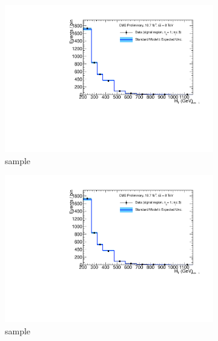 \begin{figure}[h!]
\begin{subfigure}[b]{0.48\textwidth}
    \includegraphics[width=\textwidth,page=4]
    {Figs/results/v0/blueBand/bestFit_2012dev_RQcdZero_fZinvAll_1b_le3j-12hp_smOnly}
    \caption{\mj sample}
  \end{subfigure}
  \begin{subfigure}[b]{0.48\textwidth}
    \includegraphics[width=\textwidth,page=8]
    {Figs/results/v0/blueBand/bestFit_2012dev_RQcdZero_fZinvAll_1b_le3j-12hp_smOnly}
    \caption{\mmj sample}
  \end{subfigure}\\
  \begin{subfigure}[b]{0.48\textwidth}

\end{subfigure}
\end{figure}
